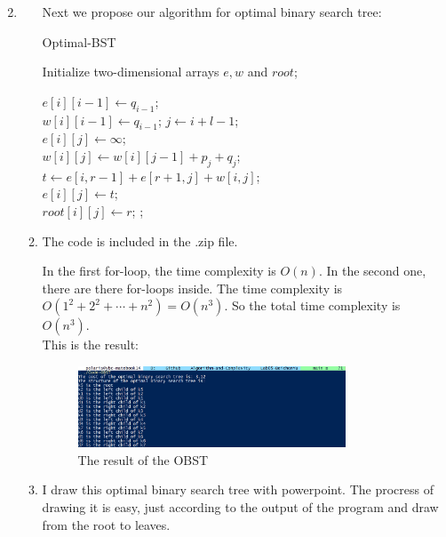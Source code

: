 \documentclass[12pt,a4paper]{article}
\makeatletter
\newtheorem*{solution}{Solution}
\theoremstyle{definition}
\renewenvironment{solution}[1][Solution] {\par\pushQED{\qed}\normalfont\topsep6\p@\@plus6\p@\relax\trivlist\item[\hskip\labelsep\bfseries#1\@addpunct{.}]\ignorespaces}{\popQED\endtrivlist\@endpefalse} \makeatother
\makeatother
\begin{document}
\begin{enumerate}
\begin{solution}
\begin{enumerate}
				Next we propose our algorithm for optimal binary search tree:
				
				
				\begin{minipage}[t]{0.8\textwidth}
        \begin{algorithm}[H]
            \BlankLine
            \caption{Optimal-BST}
            Initialize two-dimensional arrays $e,w$ and $root$;

             {
                $e[i][i-1] \leftarrow q_{i-1}$;\\
                $w[i][i-1] \leftarrow q_{i-1}$;
            }
             {
            	 {
            		$j \leftarrow i+l-1$;\\
            		$e[i][j] \leftarrow \infty$;\\
            		$w[i][j] \leftarrow w[i][j-1] + p_j + q_j$;\\
            		 {
            			$t \leftarrow  e[i,r-1] + e[r+1,j] + w[i,j]$;\\
            			{
            				$e[i][j] \leftarrow t$;\\
            				$root[i][j] \leftarrow r$;
            			}
            		}
            	}
            }
            ;
        \end{algorithm}
        \end{minipage}
				
				\item The code is included in the .zip file. 
				
				In the first for-loop, the time complexity is $O(n)$. In the second one, there are there for-loops inside. The time complexity is $O(1^2+2^2+\cdots + n^2) = O(n^3)$. So the total time complexity is $O(n^3)$.\\
				
				This is the result:
		       		\begin{figure}[H]
    \centering
    \includegraphics[width=0.8\textwidth]{obst.png}
    \caption{The result of the OBST}
\end{figure}
				\item I draw this  optimal binary search tree with powerpoint. The procress of drawing it is easy, just according to the output of the program and draw from the root to leaves.
				

\end{enumerate}
\end{solution}
\end{enumerate}
\end{document}
